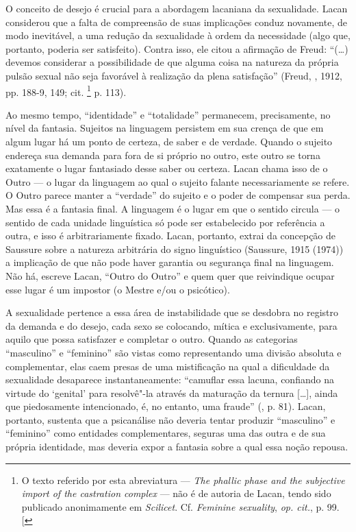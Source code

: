 O conceito de desejo é crucial para a abordagem lacaniana da
sexualidade. Lacan considerou que a falta de compreensão de suas
implicações conduz novamente, de modo inevitável, a uma redução da
sexualidade à ordem da necessidade (algo que, portanto, poderia ser
satisfeito). Contra isso, ele citou a afirmação de Freud: ``(\ldots{})
devemos considerar a possibilidade de que alguma coisa na natureza da
própria pulsão sexual não seja favorável à realização da plena
satisfação'' (Freud, , 1912, pp. 188-9, 149; cit. \footnote{O texto
  referido por esta abreviatura --- \emph{The phallic phase and the
  subjective import of the castration complex} --- não é de autoria de
  Lacan, tendo sido publicado anonimamente em \emph{Scilicet}. Cf.
  \emph{Feminine sexuality}, \emph{op. cit.}, p. 99. {[}\versal{N.~T.}{]}} p.
113).

Ao mesmo tempo, ``identidade'' e ``totalidade'' permanecem,
precisamente, no nível da fantasia. Sujeitos na linguagem persistem em
sua crença de que em algum lugar há um ponto de certeza, de saber e de
verdade. Quando o sujeito endereça sua demanda para fora de si próprio
no outro, este outro se torna exatamente o lugar fantasiado desse saber
ou certeza. Lacan chama isso de o Outro --- o lugar da linguagem ao qual
o sujeito falante necessariamente se refere. O Outro parece manter a
``verdade'' do sujeito e o poder de compensar sua perda. Mas essa é a
fantasia final. A linguagem é o lugar em que o sentido circula --- o
sentido de cada unidade linguística só pode ser estabelecido por
referência a outra, e isso é arbitrariamente fixado. Lacan, portanto,
extrai da concepção de Saussure sobre a natureza arbitrária do signo
linguístico (Saussure, 1915 (1974)) a implicação de que não pode haver
garantia ou segurança final na linguagem. Não há, escreve Lacan, ``Outro
do Outro'' e quem quer que reivindique ocupar esse lugar é um impostor
(o Mestre e/ou o psicótico).

A sexualidade pertence a essa área de instabilidade que se desdobra no
registro da demanda e do desejo, cada sexo se colocando, mítica e
exclusivamente, para aquilo que possa satisfazer e completar o outro.
Quando as categorias ``masculino'' e ``feminino'' são vistas como
representando uma divisão absoluta e complementar, elas caem presas de
uma mistificação na qual a dificuldade da sexualidade desaparece
instantaneamente: ``camuflar essa lacuna, confiando na virtude do
`genital' para resolvê"-la através da maturação da ternura {[}\ldots{}{]},
ainda que piedosamente intencionado, é, no entanto, uma fraude'' (, p.
81). Lacan, portanto, sustenta que a psicanálise não deveria tentar
produzir ``masculino'' e ``feminino'' como entidades complementares,
seguras uma das outra e de sua própria identidade, mas deveria expor a
fantasia sobre a qual essa noção repousa.

